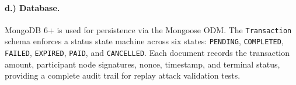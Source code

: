 \documentclass[a4paper]{scl-article}
\begin{document}
\paragraph{d.) Database.}
MongoDB 6+ is used for persistence via the Mongoose ODM. The \texttt{Transaction} schema enforces a status state machine across six states: \texttt{PENDING}, \texttt{COMPLETED}, \texttt{FAILED}, \texttt{EXPIRED}, \texttt{PAID}, and \texttt{CANCELLED}. Each document records the transaction amount, participant node signatures, nonce, timestamp, and terminal status, providing a complete audit trail for replay attack validation tests.



%







%

\newpage

\label{sect:bib}

%
%
%



\end{document}
